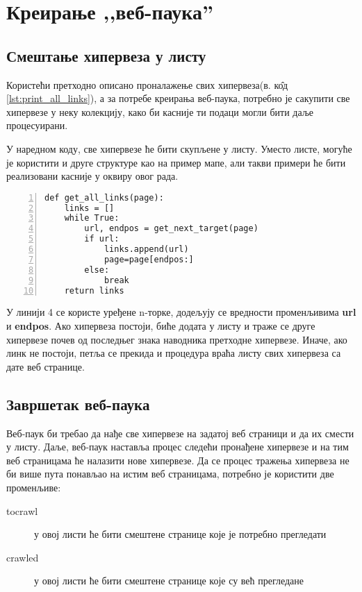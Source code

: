 \section{Креирање ,,веб-паука''}

\subsection{Смештање хипервеза у листу}

Користећи претходно описано проналажење свих хипервеза(в. к\^{о}д \ref{lst:print_all_links}), а за потребе креирања веб-паука, потребно је сакупити све хипервезе у неку колекцију, како би касније ти подаци могли бити даље процесуирани.

У наредном коду, све хипервезе ће бити скупљене у листу. Уместо листе, могуће је користити и друге структуре као на пример мапе, али такви примери ће бити реализовани касније у оквиру овог рада.

\begin{lstlisting}[caption=Процедура смештања свих хиперлинкова у листу, label={lst:getalllinks}, numbers=left]
def get_all_links(page):
    links = []
    while True:
        url, endpos = get_next_target(page)
        if url:
            links.append(url)
            page=page[endpos:]
        else:
            break
    return links
\end{lstlisting}

У линији 4 се користе уређене n-торке, додељују се вредности променљивима \textbf{url} и \textbf{endpos}. Ако хипервеза постоји, биће додата у листу и траже се друге хипервезе почев од последњег знака наводника претходне хипервезе. Иначе, ако линк не постоји, петља се прекида и процедура враћа листу свих хипервеза са дате веб странице.

\subsection{Завршетак веб-паука}

Веб-паук би требао да нађе све хипервезе на задатој веб страници и да их смести
у листу. Даље, веб-паук наставља процес следећи пронађене хипервезе и на тим веб
страницама ће налазити нове хипервезе. Да се процес тражења хипервеза не би више
пута понављао на истим веб страницама, потребно је користити две променљиве:

\begin{description}
\item[tocrawl] у овој листи ће бити смештене странице које је потребно прегледати
\item[crawled] у овој листи ће бити смештене странице које су већ прегледане
\end{description}

